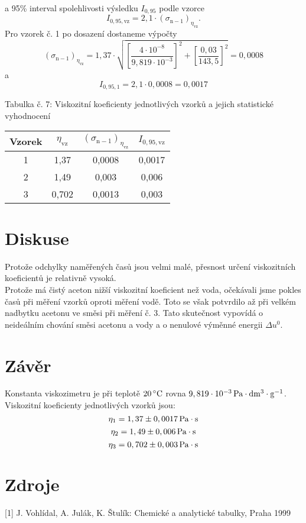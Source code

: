 \documentclass[12pt,a4paper]{article}
\def\ri#1{\mathrm{#1}}
\def\jd#1{\ifmmode\,\mathrm{#1}\else\,\textrm{#1}\fi}
\begin{document}
a 95\% interval spolehlivosti výsledku $I_\ri{0,95}$ podle vzorce
\begin{equation}
	I_\ri{0,95, vz} = 2,1\cdot (\sigma_\ri{n-1})_{\eta_\ri{vz}}.
\end{equation}
Pro vzorek č. 1 po dosazení dostaneme výpočty
$$(\sigma_\ri{n-1})_{\eta_\ri{vz}} = 1,37 \cdot \sqrt{\left[\dfrac{4\cdot 10^{-8}}{9,819\cdot 10^{-3}}\right]^2 + \left[\dfrac{0,03}{143,5}\right]^2} = 0,0008$$
a 
$$I_\ri{0,95, 1} = 2,1\cdot 0,0008 = 0,0017$$
\begin{center}
	\noindent Tabulka č. 7: Viskozitní koeficienty jednotlivých vzorků a jejich statistické vyhodnocení\\
	\begin{tabular}{c|c|c|c}
		Vzorek & $\eta_\ri{vz}$ & $(\sigma_\ri{n-1})_{\eta_\ri{vz}}$ & $I_\ri{0,95, vz}$\\
		\hline
		1 & 1,37 & 0,0008 & 0,0017\\
		2 & 1,49 & 0,003 & 0,006\\
		3 & 0,702 & 0,0013 & 0,003\\
	\end{tabular}
\end{center}
\section*{Diskuse}
Protože odchylky naměřených časů jsou velmi malé, přesnost určení viskozitních koeficientů je relativně vysoká. \\
Protože má čistý aceton nižší viskozitní koeficient než voda, očekávali jsme pokles časů při měření vzorků oproti měření vodě. Toto se však potvrdilo až při velkém nadbytku acetonu ve směsi při měření č. 3. Tato skutečnost vypovídá o neideálním chování směsi acetonu a vody a o nenulové výměnné energii $\Delta u^0$.
\section*{Závěr}
Konstanta viskozimetru je při teplotě $20\jd{^\circ C}$ rovna $9,819\cdot 10^{-3}\jd{Pa\cdot dm^3 \cdot g^{-1}}$.\\
Viskozitní koeficienty jednotlivých vzorků jsou:
$$\eta_\ri{1} = 1,37\pm0,0017\jd{Pa\cdot s}$$
$$\eta_\ri{2} = 1,49\pm0,006\jd{Pa\cdot s}$$
$$\eta_\ri{3} = 0,702\pm0,003\jd{Pa\cdot s}$$
\section*{Zdroje}
[1] J. Vohlídal, A. Julák, K. Štulík: Chemické a analytické tabulky, Praha 1999
\end{document}
